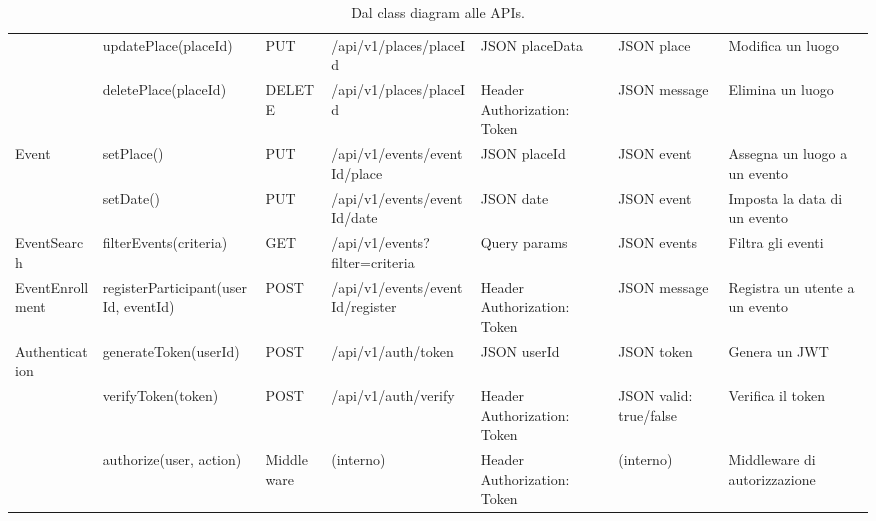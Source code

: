 \documentclass[9pt]{extarticle}
\begin{document}
\begin{table}[!htb]
{\begin{tabular}{lllllll}
	& updatePlace(placeId)                 & PUT         & /api/v1/places/{placeId}          & JSON {placeData}               & JSON {place}                     & Modifica un luogo \\
	& deletePlace(placeId)                 & DELETE      & /api/v1/places/{placeId}          & Header {Authorization: Token}  & JSON {message}                   & Elimina un luogo \\ \midrule
	Event           & setPlace()                           & PUT         & /api/v1/events/{eventId}/place    & JSON {placeId}                 & JSON {event}                     & Assegna un luogo a un evento \\
	& setDate()                            & PUT         & /api/v1/events/{eventId}/date     & JSON {date}                    & JSON {event}                     & Imposta la data di un evento \\ \midrule
	EventSearch     & filterEvents(criteria)               & GET         & /api/v1/events?filter={criteria}  & Query params                   & JSON {events}                    & Filtra gli eventi \\ \midrule
	EventEnrollment & registerParticipant(userId, eventId) & POST        & /api/v1/events/{eventId}/register & Header {Authorization: Token}  & JSON {message}                   & Registra un utente a un evento \\ \midrule
	Authentication  & generateToken(userId)                & POST        & /api/v1/auth/token                & JSON {userId}                  & JSON {token}                     & Genera un JWT \\
	& verifyToken(token)                   & POST        & /api/v1/auth/verify               & Header {Authorization: Token}  & JSON {valid: true/false}         & Verifica il token \\
	& authorize(user, action)              & Middleware  & (interno)                         & Header {Authorization: Token}  & (interno)                        & Middleware di autorizzazione \\ \bottomrule
\end{tabular}%
}
\caption{Dal class diagram alle APIs.}
\label{tab:class2API}
\end{table}
\end{document}
